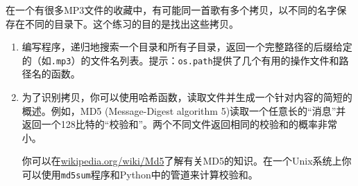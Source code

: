 \begin{ex}
\label{和校验}


在一个有很多MP3文件的收藏中，有可能同一首歌有多个拷贝，以不同的名字保存在不同的目录下。这个练习的目的是找出这些拷贝。

\begin{enumerate}

\item 编写程序，递归地搜索一个目录和所有子目录，返回一个完整路径的后缀给定的（如{\tt .mp3}）的文件名列表。提示：{\tt os.path}提供了几个有用的操作文件和路径名的函数。


\item 为了识别拷贝，你可以使用哈希函数，读取文件并生成一个针对内容的简短的概述。例如，MD5 (Message-Digest algorithm 5)读取一个任意长的“消息”并返回一个128比特的“校验和”。两个不同文件返回相同的校验和的概率非常小。

你可以在\url{wikipedia.org/wiki/Md5}了解有关MD5的知识。在一个Unix系统上你可以使用{\tt md5sum}程序和Python中的管道来计算校验和。


\end{enumerate}

\end{ex}


